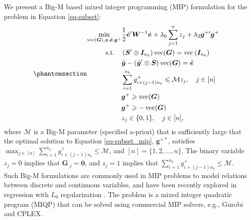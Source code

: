 \documentclass[
  11pt]{article}
\theoremstyle{plain}
\theoremstyle{remark}
\begin{document}
We present a Big-M based mixed integer programming (MIP) formulation for
the problem in Equation \eqref{eq-subset}:
\begin{equation}\phantomsection\label{eq-subset_mip}{
\begin{aligned}
\min_{\operatorname{vec}(\bm{G}), \bm{z}, \check{\bm{e}}, \bm{g}^{+}} & \frac{1}{2}\check{\bm{e}}^{\prime} \bm{W}^{-1}\check{\bm{e}} + \lambda_0 \sum_{j=1}^n z_j + \lambda_2 \bm{g}^{+\prime}\bm{g}^{+} \\
\text{s.t.} \quad & \left(\bm{S}^{\prime} \otimes \bm{I}_{n_b}\right) \operatorname{vec}(\bm{G})=\operatorname{vec}\left(\bm{I}_{n_b}\right) \\
& \hat{\bm{y}}-\left(\hat{\bm{y}}^{\prime} \otimes \bm{S}\right)\operatorname{vec}(\bm{G}) = \check{\bm{e}} \\
& \sum_{i=1}^{n_b} g_{i + (j-1) n_b}^{+} \leqslant \mathcal{M} z_j, \quad j \in[n] \\
& \bm{g}^{+} \geqslant \operatorname{vec}(\bm{G}) \\
& \bm{g}^{+} \geqslant-\operatorname{vec}(\bm{G}) \\
& z_j \in\{0,1\}, \quad j \in[n],
\end{aligned}
}\end{equation} where \(\mathcal{M}\) is a Big-M parameter (specified
a-priori) that is sufficiently large that the optimal solution to
Equation \eqref{eq-subset_mip}, \(\bm{g}^{+*}\), satisfies
\(\max_{j \in [n]}\sum_{i=1}^{n_b} g_{i + (j-1) n_b}^{+} \leqslant \mathcal{M}\),
and \([n]=\{1,2,\ldots,n\}\). The binary variable \(z_j=0\) implies that
\(\bm{G}_{\cdot j}=\bm{0}\), and \(z_j=1\) implies that
\(\sum_{i=1}^{n_b} g_{i + (j-1) n_b}^{+} \leqslant \mathcal{M}\). Such
Big-M formulations are commonly used in MIP problems to model relations
between discrete and continuous variables, and have been recently
explored in regression with \(L_0\) regularization
\citep{Bertsimas2016-ig}. The problem is a mixed integer quadratic
program (MIQP) that can be solved using commercial MIP solvers, e.g.,
Gurobi and CPLEX.
\end{document}
